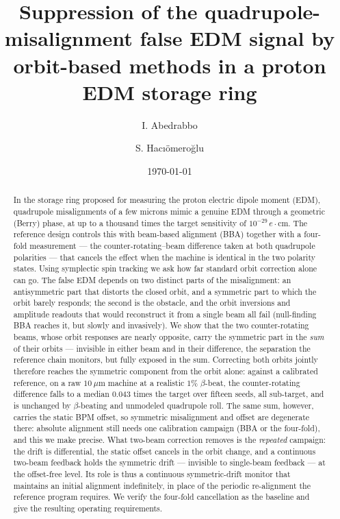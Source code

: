 \documentclass[aps,prab,reprint,superscriptaddress,nofootinbib]{revtex4-2}
\begin{document}
\title{Suppression of the quadrupole-misalignment false EDM signal by
orbit-based methods in a proton EDM storage ring}

\author{I. Abedrabbo}
\author{S. Hac{\i}\"omero\u{g}lu}

\date{\today}


\begin{abstract}
In the storage ring proposed for measuring the proton electric dipole moment
(EDM), quadrupole misalignments of a few microns mimic a genuine EDM through a
geometric (Berry) phase, at up to a thousand times the target sensitivity of
$10^{-29}\,e\!\cdot\!$cm.  The reference design controls this with beam-based
alignment (BBA) together with a four-fold measurement --- the
counter-rotating--beam difference taken at both quadrupole polarities --- that
cancels the effect when the machine is identical in the two polarity states.
Using symplectic spin tracking we ask how far standard orbit correction alone
can go.  The false EDM depends on two distinct parts of the misalignment: an
antisymmetric part that distorts the closed orbit, and a symmetric part to
which the orbit barely responds; the second is the obstacle, and the orbit
inversions and amplitude readouts that would reconstruct it from a single beam
all fail (null-finding BBA reaches it, but slowly and invasively).  We show that the two counter-rotating beams,
whose orbit responses are nearly opposite, carry the symmetric part in the
\emph{sum} of their orbits --- invisible in either beam and in their difference,
the separation the reference chain monitors, but fully exposed in the sum.
Correcting both orbits jointly therefore reaches the symmetric component from
the orbit alone: against a calibrated reference, on a raw $10~\mu$m machine at a
realistic $1\%$ $\beta$-beat, the counter-rotating difference falls to a median
$0.043$ times the target over fifteen seeds, all sub-target, and is unchanged by
$\beta$-beating and unmodeled quadrupole roll.  The same sum, however, carries
the static BPM offset, so symmetric misalignment and offset are degenerate
there: absolute alignment still needs one calibration campaign (BBA or the
four-fold), and this we make precise.  What two-beam correction removes is the
\emph{repeated} campaign: the drift is differential, the static offset cancels
in the orbit change, and a continuous two-beam feedback holds the symmetric
drift --- invisible to single-beam feedback --- at the offset-free level.  Its
role is thus a continuous symmetric-drift monitor that maintains an initial
alignment indefinitely, in place of the periodic re-alignment the reference
program requires.  We verify the four-fold cancellation as the baseline and give
the resulting operating requirements.
\end{abstract}
\end{document}
